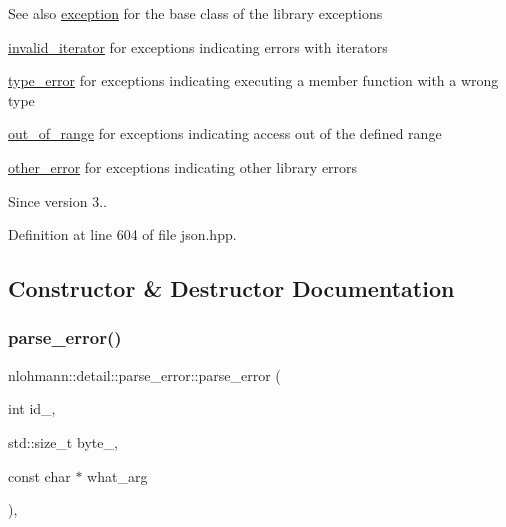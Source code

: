 \begin{DoxySeeAlso}{See also}
\hyperlink{classnlohmann_1_1detail_1_1exception}{exception} for the base class of the library exceptions 

\hyperlink{classnlohmann_1_1detail_1_1invalid__iterator}{invalid\+\_\+iterator} for exceptions indicating errors with iterators 

\hyperlink{classnlohmann_1_1detail_1_1type__error}{type\+\_\+error} for exceptions indicating executing a member function with a wrong type 

\hyperlink{classnlohmann_1_1detail_1_1out__of__range}{out\+\_\+of\+\_\+range} for exceptions indicating access out of the defined range 

\hyperlink{classnlohmann_1_1detail_1_1other__error}{other\+\_\+error} for exceptions indicating other library errors
\end{DoxySeeAlso}
\begin{DoxySince}{Since}
version 3.. 
\end{DoxySince}


Definition at line 604 of file json.\+hpp.



\subsection{Constructor \& Destructor Documentation}
\mbox{\label{classnlohmann_1_1detail_1_1parse__error_a0ea816ea3521d7109407948cb1b850f7}} 
\subsubsection{\texorpdfstring{parse\+\_\+error()}{parse\_error()}}
{\footnotesize\ttfamily nlohmann\+::detail\+::parse\+\_\+error\+::parse\+\_\+error (\begin{DoxyParamCaption}\item[{int}]{id\+\_\+,  }\item[{std\+::size\+\_\+t}]{byte\+\_\+,  }\item[{const char $\ast$}]{what\+\_\+arg }\end{DoxyParamCaption})\hspace{0.3cm}{\ttfamily [inline]}, {\ttfamily [private]}}



